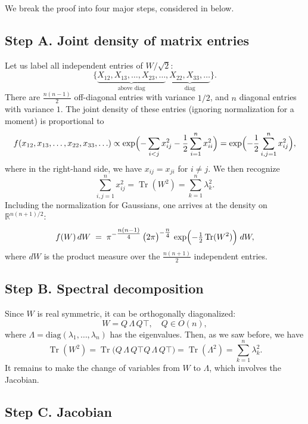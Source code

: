 \documentclass[letterpaper,11pt,oneside,reqno]{article}
\numberwithin{equation}{section}
\theoremstyle{definition}
\begin{document}
We break the proof into four major steps,
considered in
below.

\subsection{Step A. Joint density of matrix entries}
\label{subsec:density-entries}

Let us label all independent entries of \(W/\sqrt 2\):
\[
	\{\underbrace{X_{12}, X_{13},\dots, X_{23},\ldots }_{\text{above diag}},
	\underbrace{X_{22}, X_{33},\dots}_{\text{diag}}\}.
\]
There are \(\frac{n(n-1)}{2}\) off-diagonal entries
with variance $1/2$,
and \(n\) diagonal entries with variance $1$.
The joint density of these entries (ignoring normalization for a moment) is
proportional to
\begin{equation}
	\label{eq:GOE-density-entries-first}
	f(x_{12},x_{13},\ldots,x_{22},x_{33},\ldots )
  \propto\exp\Bigl(
    - \sum_{i<j} x_{ij}^2
    -\frac{1}{2} \sum_{i=1}^n x_{ii}^2
  \Bigr)=
	\exp
	\Bigl( -\frac{1}{2}\sum_{i,j=1}^n x_{ij}^2 \Bigr),
\end{equation}
where in the right-hand side, we have
$x_{ij}=x_{ji}$ for $i\ne j$.
We then recognize
\[
	\sum_{i,j=1}^n x_{ij}^2=\operatorname{Tr}(W^2)=\sum_{k=1}^n \lambda_k^2.
\]
Including the normalization for Gaussians, one arrives at
the density on $\mathbb{R}^{n(n+1)/2}$:
\[
  f(W)\,dW
  \;=\;
  \pi^{-\tfrac{n(n-1)}{4}}
  \,\bigl(2\pi\bigr)^{-\tfrac{n}{4}}
  \,\exp\Bigl(-\tfrac{1}{2}\operatorname{Tr}(W^2)\Bigr)\; dW,
\]
where \(dW\) is the product measure over the \(\tfrac{n(n+1)}{2}\) independent entries.

\subsection{Step B. Spectral decomposition}
\label{subsec:spectral}

Since \(W\) is real symmetric, it can be orthogonally diagonalized:
\[
  W = Q\,\Lambda\,Q\top,\quad
  Q \in O(n),
\]
where \(\Lambda = \mathrm{diag}(\lambda_1,\ldots,\lambda_n)\) has the eigenvalues.  Then, as we saw before, we have
\[
  \operatorname{Tr}(W^2)
  = \operatorname{Tr}\bigl(Q\,\Lambda\,Q\top Q\,\Lambda\,Q\top\bigr)
  = \operatorname{Tr}(\Lambda^2)
  = \sum_{k=1}^n \lambda_k^2.
\]
It remains to make the change of variables from \(W\) to \(\Lambda\), which involves the Jacobian.

\subsection{Step C. Jacobian}
\label{subsec:jacobian}
\end{document}
